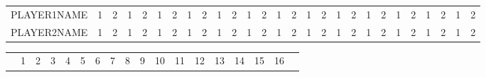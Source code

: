 \documentclass[22pt]{scrartcl}
\begin{document}
\begin{table}
\begin{tabular}{p{5cm}|c|c|c|c|c|c|c|c|c|c|c|c|c|c|c|c|c|c|c|c|c|c|c|c|c|c|}


\cline{2-27}
PLAYER1NAME & \footnotesize 1 & \footnotesize 2 & \footnotesize 1 & \footnotesize 2 & \footnotesize 1 & \footnotesize 2 & \footnotesize 1 & \footnotesize 2 & \footnotesize 1 & \footnotesize 2 & \footnotesize 1 & \footnotesize 2 & \footnotesize 1 & \footnotesize 2 & \footnotesize 1 & \footnotesize 2 & \footnotesize 1 & \footnotesize 2 & \footnotesize 1 & \footnotesize 2 & \footnotesize 1 & \footnotesize 2 & \footnotesize 1 & \footnotesize 2 & \footnotesize 1 & \footnotesize 2 \\
\cline{1-27} 

\cline{1-27}
PLAYER2NAME & \footnotesize 1 & \footnotesize 2 & \footnotesize 1 & \footnotesize 2 & \footnotesize 1 & \footnotesize 2 & \footnotesize 1 & \footnotesize 2 & \footnotesize 1 & \footnotesize 2 & \footnotesize 1 & \footnotesize 2 & \footnotesize 1 & \footnotesize 2 & \footnotesize 1 & \footnotesize 2 & \footnotesize 1 & \footnotesize 2 & \footnotesize 1 & \footnotesize 2 & \footnotesize 1 & \footnotesize 2 & \footnotesize 1 & \footnotesize 2 & \footnotesize 1 & \footnotesize 2 \\
\cline{2-27}

\end{tabular}

\begin{tabular}{p{5cm}|c|c|c|c|c|c!{\vrule width 2pt}c|c|c|c|c|c|c|c|c|c!{\vrule width 3pt}p{1cm}!{\vrule width 3pt}}

& 1 & 2 & 3 & 4 & 5 & 6 & 7 & 8 & 9 & 10 & 11 & 12 & 13 & 14 & 15 & 16 & \\
\end{tabular}

\end{table}
\end{document}
